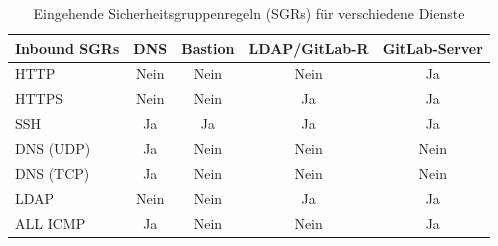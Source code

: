 \documentclass[a4paper,12pt]{article}
\begin{document}
\begin{table}[h!]
	\centering
	\begin{tabular}{|l|c|c|c|c|}
		\hline
		\textbf{Inbound SGRs} & \textbf{DNS} & \textbf{Bastion} & \textbf{LDAP/GitLab-R} & \textbf{GitLab-Server} \\ \hline
		HTTP                  & Nein         & Nein             & Nein                   & Ja                     \\ \hline
		HTTPS                 & Nein         & Nein             & Ja                     & Ja                     \\ \hline
		SSH                   & Ja           & Ja               & Ja                     & Ja                     \\ \hline
		DNS (UDP)             & Ja           & Nein             & Nein                   & Nein                   \\ \hline
		DNS (TCP)             & Ja           & Nein             & Nein                   & Nein                   \\ \hline
		LDAP                  & Nein         & Nein             & Ja                     & Ja                     \\ \hline
		ALL ICMP              & Ja           & Nein             & Nein                   & Ja                     \\ \hline
	\end{tabular}
	\caption{Eingehende Sicherheitsgruppenregeln (SGRs) für verschiedene Dienste}
	\label{tab:inbound-sgrs}
\end{table}
\end{document}
